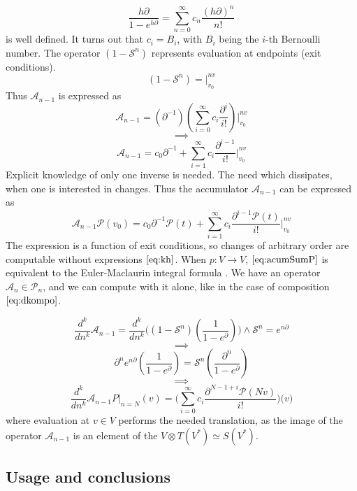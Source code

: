 \documentclass{article}
\newcommand{\Shift}{\mathcal{S}}
\newcommand{\dP}{\mathcal{P}}
\newcommand{\D}{\partial}
\begin{document}
    \begin{equation}
    	\frac{h\D}{1-e^{h\D}}=\sum\limits_{n=0}^{\infty}c_n\frac{(h\D)^n}{n!}
    \end{equation}
    is well defined. It turns out that $c_i=B_i$, with $B_i$ being the $i$-th Bernoulli number. The operator $(1-\Shift^n)$ represents evaluation at endpoints (exit conditions).
    $$(1-\Shift^n)=\Bigg\vert_{v_0}^{nv}$$
    Thus $\mathcal{A}_{n-1}$ is expressed as
    $$\mathcal{A}_{n-1}=(\D^{-1})(\sum\limits_{i=0}^{\infty}c_i\frac{\D^i}{i!})\Bigg\vert_{v_0}^{nv}$$
    $$\implies$$
    \begin{equation}\label{eq:acumSum}
    \mathcal{A}_{n-1}=c_0\D^{-1}+\sum\limits_{i=1}^{\infty}c_i\frac{\D^{i-1}}{i!}\Bigg\vert_{v_0}^{nv}
    \end{equation}
    Explicit knowledge of only one inverse is needed. The need which dissipates, when one is interested in changes. Thus the accumulator  $\mathcal{A}_{n-1}$ can be expressed as
    \begin{equation}\label{eq:acumSumP}
    	\mathcal{A}_{n-1}\dP(v_0)=c_0\D^{-1}\dP(t)+\sum\limits_{i=1}^{\infty}c_i\frac{\D^{i-1}\dP(t)}{i!}\Bigg\vert_{v_0}^{nv}
    \end{equation}
    The expression is a function of exit conditions, so changes of arbitrary order are computable without expressions $\eqref{eq:kh}$. When $p:V\to V$, $\eqref{eq:acumSumP}$ is equivalent to the Euler-Maclaurin integral formula \cite{EulerSumAbramowitzStegun}.  We have an operator $\mathcal{A}_n\in\dP_n$, and we can compute with it alone, like in the case of composition $\eqref{eq:dkompo}$.

    $$\frac{d^k}{dn^k}\mathcal{A}_{n-1}=\frac{d^k}{dn^k}\Big((1-\Shift^n)(\frac{1}{1-e^\D})\Big)\land \Shift^n=e^{n\D}$$
        $$\implies$$
        $$\D^n e^{n\D}(\frac{1}{1-e^\D}) = \Shift^n(\frac{\D^n}{1-e^\D})$$
        $$\implies$$
        \begin{equation}
        \frac{d^k}{dn^k}\mathcal{A}_{n-1}P\vert_{n=N}(v)=\Big(\sum\limits_{i=0}^{\infty}c_i\frac{\D^{N-1+i}\dP(Nv)}{i!}\Big)\Big(v\Big)
        \end{equation}
        where evaluation at $v\in V$ performs the needed translation, as the image of the operator $\mathcal{A}_{n-1}$ is an element of the $V\otimes T(V^*)\simeq S(V^*)$.

\subsection{Usage and conclusions} 
\end{document}
